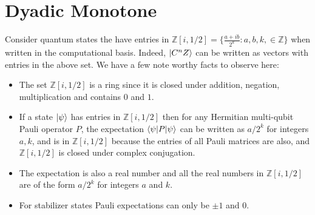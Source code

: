 \documentclass[12pt]{dalthesis}
\begin{document}
%
%

\section{Dyadic Monotone}
Consider quantum states the have entries in $\mathbb{Z}[i, 1/2] = \big\{\frac{a+ib}{2^k}: a, b, k, \in \mathbb{Z} \big\}$ when written in the computational basis. Indeed, $\ket{C^nZ}$ can be written as vectors with entries in the above set. We have a few note worthy facts to observe here:
\begin{itemize}
\item The set $\mathbb{Z}[i, 1/2]$ is a ring since it is closed under addition, negation, multiplication and contains $0$ and $1$.
\item If a state $\ket{\psi}$ has entries in $\mathbb{Z}[i, 1/2]$ then for any Hermitian multi-qubit Pauli operator $P$, the expectation $\braket{\psi | P | \psi}$ can be written as $a/2^k$ for integers $a, k$, and is in $\mathbb{Z}[i, 1/2]$ because the entries of all Pauli matrices are also, and $\mathbb{Z}[i, 1/2]$ is closed under complex conjugation.
\item The expectation is also a real number and all the real numbers in $\mathbb{Z}[i, 1/2]$ are of the form $a/2^k$ for integers $a$ and $k$. 
\item For stabilizer states Pauli expectations can only be $\pm 1$ and $0$.
\end{itemize}
\end{document}
